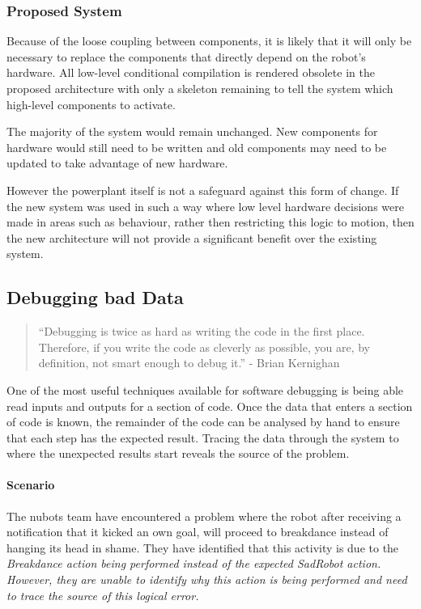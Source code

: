 \documentclass[english,12pt]{scrartcl}
\begin{document}
			\subsubsection{Proposed System}
				Because of the loose coupling between components, it is likely that it will only be necessary to replace the components that directly depend on the robot’s hardware.
				All low-level conditional compilation is rendered obsolete in the proposed architecture with only a skeleton remaining to tell the system which high-level components to activate.

				The majority of the system would remain unchanged. New components for hardware would still need to be written and old components may need to be updated to take advantage of new hardware.

				However the \gls{powerplant} itself is not a safeguard against this form of change. If the new system was used in such a way where low level hardware decisions were made in areas such as behaviour, rather then restricting this logic to motion, then the new architecture will not provide a significant benefit over the existing system.

		\subsection{Debugging bad Data}
			\begin{quote}``Debugging is twice as hard as writing the code in the first place. Therefore, if you write the code as cleverly as possible, you are, by definition, not smart enough to debug it.'' - Brian Kernighan\end{quote}
			One of the most useful techniques available for software debugging is being able read inputs and outputs for a section of code. Once the data that enters a section
			of code is known, the remainder of the code can be analysed by hand to ensure that each
			step has the expected result. Tracing the data through the system to where the unexpected results start reveals the source of the problem.

			\paragraph{Scenario} The \gls{nubots} team have encountered a problem where the robot after
			receiving a notification that it kicked an own goal, will proceed to breakdance instead
			of hanging its head in shame. They have identified that this activity is due to the
			\em{Breakdance} action being performed instead of the expected \em{SadRobot} action. However, they are unable to identify why this action is being performed and need to trace the source
			of this logical error.
\end{document}
